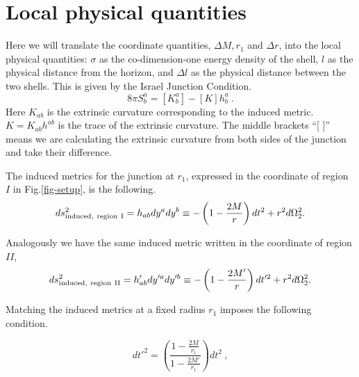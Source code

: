 \documentclass[aps,showpacs,onecolumn,floats,prd,superscriptaddress,nofootinbib]{revtex4-1}
\begin{document}
%
%

\section{Local physical quantities}
\label{finalEq}

Here we will translate the coordinate quantities, $\Delta M, r_1$ and $\Delta r$, into the local physical quantities: $\sigma$ as the co-dimension-one energy density of the shell, $l$ as the physical distance from the horizon, and $\Delta l$ as the physical distance between the two shells.
This is given by the Israel Junction Condition.
\begin{equation}
	8 \pi S^a_b = [K^a_b] - [K]h^a_b~.	\label{IJC}
\end{equation}	
Here $K_{ab}$ is the extrinsic curvature corresponding to the induced metric.
$K = K_{ab} h^{ab}$ is the trace of the extrinsic curvature.
The middle brackets ``[ ]'' means we are calculating the extrinsic curvature from both sides of the junction and take their difference.

The induced metrics for the junction at $r_1$, expressed in the coordinate of region $I$ in Fig.\ref{fig-setup}, is the following.
\begin{equation}
	ds_{\rm induced, \ region \ I}^2 = h_{ab} dy^a dy^b \equiv - \left( 1 - \frac{2M}{r} \right) dt^2 + r^2 d \Omega_2^2.	\label{13}
\end{equation}

Analogously we have the same induced metric written in the coordinate of region $II$,
\begin{equation}
	ds_{\rm induced, \ region \ II}^2 = h'_{ab} dy'^a dy'^b \equiv - \left( 1 - \frac{2M'}{r} \right) dt'^2 + r^2 d \Omega_2^2.	\label{14}
\end{equation}

Matching the induced metrics at a fixed radius $r_1$ imposes the following condition. 

\begin{equation}
	dt'^2 = \left( \frac{1 - \frac{2M}{r_1}}{ 1- \frac{2M'}{r_1}} \right) dt^2~,
\end{equation}
\end{document}
